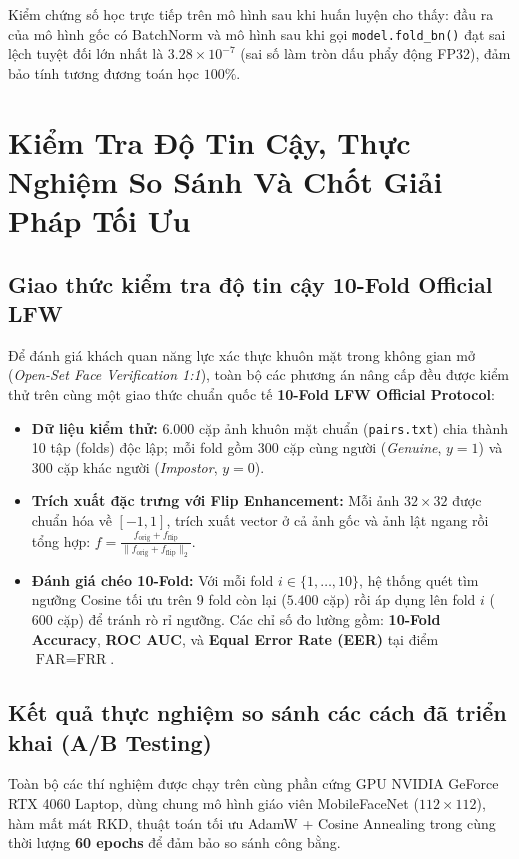 \documentclass[11pt,a4paper]{article}
\begin{document}
Kiểm chứng số học trực tiếp trên mô hình sau khi huấn luyện cho thấy: đầu ra của mô hình gốc có BatchNorm và mô hình sau khi gọi \texttt{model.fold\_bn()} đạt sai lệch tuyệt đối lớn nhất là $3.28 \times 10^{-7}$ (sai số làm tròn dấu phẩy động FP32), đảm bảo tính tương đương toán học $100\%$.

\section{Kiểm Tra Độ Tin Cậy, Thực Nghiệm So Sánh Và Chốt Giải Pháp Tối Ưu}

\subsection{Giao thức kiểm tra độ tin cậy 10-Fold Official LFW}
Để đánh giá khách quan năng lực xác thực khuôn mặt trong không gian mở (\textit{Open-Set Face Verification 1:1}), toàn bộ các phương án nâng cấp đều được kiểm thử trên cùng một giao thức chuẩn quốc tế \textbf{10-Fold LFW Official Protocol}:
\begin{itemize}
    \item \textbf{Dữ liệu kiểm thử:} $6.000$ cặp ảnh khuôn mặt chuẩn (\texttt{pairs.txt}) chia thành 10 tập (folds) độc lập; mỗi fold gồm $300$ cặp cùng người (\textit{Genuine}, $y=1$) và $300$ cặp khác người (\textit{Impostor}, $y=0$).
    \item \textbf{Trích xuất đặc trưng với Flip Enhancement:} Mỗi ảnh $32 \times 32$ được chuẩn hóa về $[-1, 1]$, trích xuất vector ở cả ảnh gốc và ảnh lật ngang rồi tổng hợp: $f = \frac{f_{\text{orig}} + f_{\text{flip}}}{\|f_{\text{orig}} + f_{\text{flip}}\|_2}$.
    \item \textbf{Đánh giá chéo 10-Fold:} Với mỗi fold $i \in \{1,\dots,10\}$, hệ thống quét tìm ngưỡng Cosine tối ưu trên 9 fold còn lại ($5.400$ cặp) rồi áp dụng lên fold $i$ ($600$ cặp) để tránh rò rỉ ngưỡng. Các chỉ số đo lường gồm: \textbf{10-Fold Accuracy}, \textbf{ROC AUC}, và \textbf{Equal Error Rate (EER)} tại điểm $\text{FAR} = \text{FRR}$.
\end{itemize}

\subsection{Kết quả thực nghiệm so sánh các cách đã triển khai (A/B Testing)}
Toàn bộ các thí nghiệm được chạy trên cùng phần cứng GPU NVIDIA GeForce RTX 4060 Laptop, dùng chung mô hình giáo viên MobileFaceNet ($112 \times 112$), hàm mất mát RKD, thuật toán tối ưu AdamW + Cosine Annealing trong cùng thời lượng \textbf{60 epochs} để đảm bảo so sánh công bằng.
\end{document}
